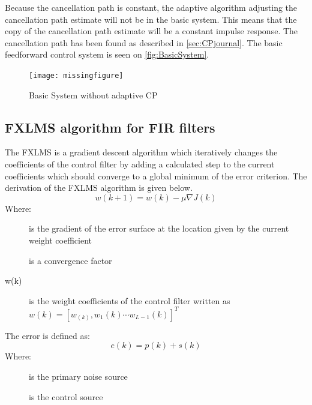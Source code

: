 Because the cancellation path is constant, the adaptive algorithm adjusting the cancellation path estimate will not be in the basic system. This means that the copy of the cancellation path estimate will be a constant impulse response. The cancellation path has been found as described in \autoref{sec:CPjournal}. The basic feedforward control system is seen on \autoref{fig:BasicSystem}. 

\begin{figure}[H]
	\centering
	\texttt{[image: missingfigure]}
	\caption{Basic System without adaptive CP}
	\label{fig:BasicSystem}
\end{figure}   






\subsection{FXLMS algorithm for FIR filters}\label{subsec:fxlms}
The FXLMS is a gradient descent algorithm which iteratively changes the coefficients of the control filter by adding a calculated step to the current coefficients which should converge to a global minimum of the error criterion. The derivation of the FXLMS algorithm is given below. 
\begin{equation}\label{eq:FXLMSNewCoef}
w(k+1) = w(k) - \mu\nabla J(k)
\end{equation}
Where:
\begin{description}
	\item[] is the gradient of the error surface at the location given by the current weight coefficient
	\item[\text{$\mu$}] is a convergence factor
	\item[w(k)] is the weight coefficients of the control filter written as  $w(k)=[w_(k),w_1(k) \cdots w_{L-1}(k)]^T$
\end{description}
The error is defined as:
\begin{equation}\label{eq:FXLMSError}
e(k) = p(k) + s(k)
\end{equation}
Where:
\begin{description}
	\item[] is the primary noise source
	\item[] is the control source
\end{description}

